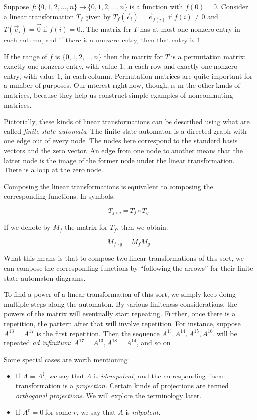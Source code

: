 \documentclass[10pt]{amsart}
\begin{document}
Suppose $f:\{ 0,1,2,\dots, n \} \to \{ 0,1,2,\dots,n \}$ is a function
with $f(0) = 0$. Consider a linear transformation $T_f$ given by
$T_f(\vec{e}_i) = \vec{e}_{f(i)}$ if $f(i) \ne 0$ and $T(\vec{e}_i) =
\vec{0}$ if $f(i) = 0$.. The matrix for $T$ has at most one nonzero
entry in each column, and if there is a nonzero entry, then that entry
is $1$.

If the range of $f$ is $\{0,1,2,\dots,n\}$ then the matrix for $T$ is a
permutation matrix: exactly one nonzero entry, with value $1$, in each
row and exactly one nonzero entry, with value $1$, in each
column. Permutation matrices are quite important for a number of
purposes. Our interest right now, though, is in the other kinds of
matrices, because they help us construct simple examples of
noncommuting matrices.

Pictorially, these kinds of linear transformations can be described
using what are called {\em finite state automata}. The finite state
automaton is a directed graph with one edge out of every node. The
nodes here correspond to the standard basis vectors and the zero
vector. An edge from one node to another means that the latter node is
the image of the former node under the linear transformation. There is
a loop at the zero node.

Composing the linear transformations is equivalent to composing the
corresponding functions. In symbols:

$$T_{f \circ g} = T_f \circ T_g$$

If we denote by $M_f$ the matrix for $T_f$, then we obtain:

$$M_{f \circ g} = M_fM_g$$

What this means is that to compose two linear transformations of this
sort, we can compose the corresponding functions by ``following the
arrows'' for their finite state automaton diagrams.

To find a power of a linear transformation of this sort, we
simply keep doing multiple steps along the automaton. By various
finiteness considerations, the powers of the matrix will eventually
start repeating. Further, once there is a repetition, the pattern
after that will involve repetition. For instance, suppose $A^{13} =
A^{17}$ is the first repetition. Then the sequence $A^{13}, A^{14},
A^{15}, A^{16}$, will be repeated {\em ad infinitum}: $A^{17} =
A^{13}, A^{18} = A^{14}$, and so on.

Some special cases are worth mentioning:

\begin{itemize}
\item If $A = A^2$, we say that $A$ is {\em idempotent}, and the
  corresponding linear transformation is a {\em projection}. Certain
  kinds of projections are termed {\em orthogonal projections}. We
  will explore the terminology later.
\item If $A^r = 0$ for some $r$, we say that $A$ is {\em nilpotent}.
\end{itemize}
\end{document}
